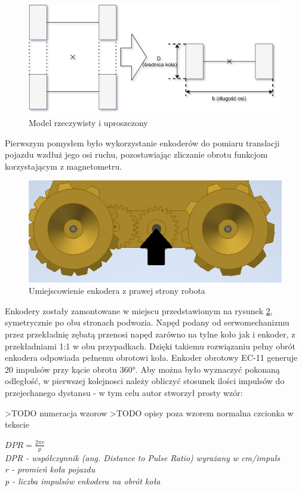 \begin{figure}[H]
	\centering
		\includegraphics[width=0.8\linewidth]{rys/robot-odometry-simplified.png}
	\caption{Model rzeczywisty i uproszczony }
	\label{fig:odom-axis-simplified}
\end{figure}


Pierwszym pomysłem było wykorzystanie enkoderów do pomiaru translacji pojazdu wzdłuż jego osi ruchu, pozostawiając zliczanie obrotu funkcjom korzystającym z magnetometru.

\begin{figure}[H]
	\centering
		\includegraphics[width=0.6\linewidth]{rys/encoder-position.png}
	\caption{Umiejscowienie enkodera z prawej strony robota}
	\label{fig:encoder-pos}
\end{figure}

Enkodery zostały zamontowane w miejscu przedstawionym na rysunek \ref{fig:encoder-pos}, symetrycznie po obu stronach podwozia. Napęd podany od serwomechanizmu przez przekładnię zębatą przenosi napęd zarówno na tylne koło jak i enkoder, z przekładniami 1:1 w obu przypadkach. Dzięki takiemu rozwiązaniu pełny obrót enkodera odpowiada pełnemu obrotowi koła. Enkoder obrotowy EC-11 generuje 20 impulsów przy kącie obrotu 360°. Aby można było wyznaczyć pokonaną odległość, w pierwszej kolejnosci należy obliczyć stosunek ilości impulsów do przejechanego dystansu - w tym celu autor stworzył prosty wzór:

>TODO numeracja wzorow
>TODO opisy poza wzorem normalna czcionka w tekscie
\begin{center}
    $DPR = \frac{2 \pi r}{p}$ \\[5pt]
    \emph{DPR - współczynnik (ang. Distance to Pulse Ratio) wyrażany w cm/impuls} \\[5pt]
    \emph{r - promień koła pojazdu} \\[5pt]
    \emph{p - liczba impulsów enkodera na obrót koła}
\end{center}

